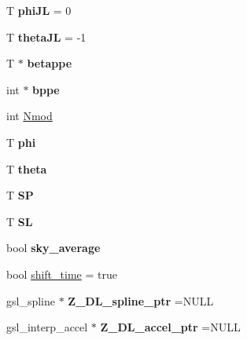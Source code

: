 \begin{DoxyCompactItemize}
T {\bfseries phi\+JL} = 0
\item 
\mbox{\label{structsource__parameters_acaead03dd2e7f25d9ccedd1cafc9f336}} 
T {\bfseries theta\+JL} = -\/1
\item 
\mbox{\label{structsource__parameters_adce0e179be1c7a14db7c4c852fd6be03}} 
T $\ast$ {\bfseries betappe}
\item 
\mbox{\label{structsource__parameters_a6c7169f21a35abbac204c83606c711a4}} 
int $\ast$ {\bfseries bppe}
\item 
int \hyperlink{structsource__parameters_a0c0678c3881ae1e62819c685b119d065}{Nmod}
\item 
\mbox{\label{structsource__parameters_ac9b7d9ce563fe8e9241e5b9165746b13}} 
T {\bfseries phi}
\item 
\mbox{\label{structsource__parameters_ad396ba7ec20fd6b3a9469b8a78fa2ea4}} 
T {\bfseries theta}
\item 
\mbox{\label{structsource__parameters_a3a575130238c416b568689ebfa1c18d5}} 
T {\bfseries SP}
\item 
\mbox{\label{structsource__parameters_a2199aebd16bde1243d2ca16f02f4a533}} 
T {\bfseries SL}
\item 
\mbox{\label{structsource__parameters_a74e2df5e9bd0e68f5c712a1a0f14f3ef}} 
bool {\bfseries sky\+\_\+average}
\item 
bool \hyperlink{structsource__parameters_acc29cebe856d34141837e5c118c31d70}{shift\+\_\+time} = true
\item 
\mbox{\label{structsource__parameters_a490daa8916bb550275f05da618d984b6}} 
gsl\+\_\+spline $\ast$ {\bfseries Z\+\_\+\+D\+L\+\_\+spline\+\_\+ptr} =N\+U\+LL
\item 
\mbox{\label{structsource__parameters_ae079ce586d3f1cdeb97c4dc82ca4629c}} 
gsl\+\_\+interp\+\_\+accel $\ast$ {\bfseries Z\+\_\+\+D\+L\+\_\+accel\+\_\+ptr} =N\+U\+LL

\end{DoxyCompactItemize}
